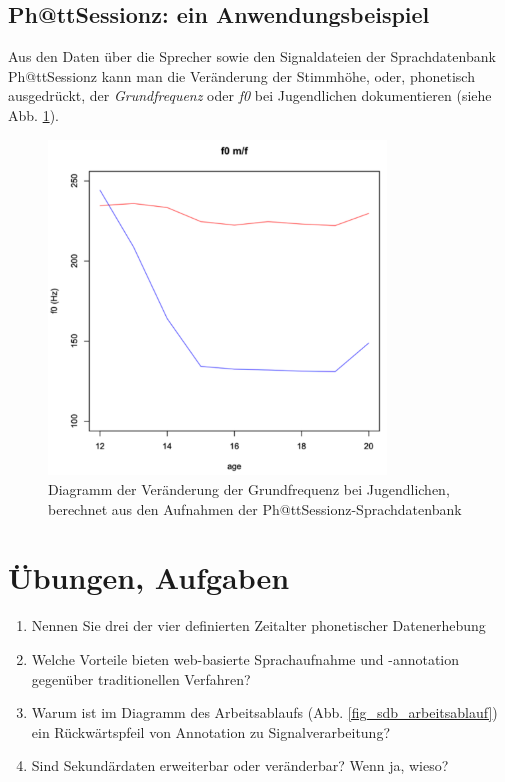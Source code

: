 \documentclass[11pt]{book}
\begin{document}
\subsection*{Ph@ttSessionz: ein Anwendungsbeispiel}
Aus den Daten über die Sprecher sowie den Signaldateien der Sprachdatenbank Ph@ttSessionz kann man die Veränderung der Stimmhöhe, oder, phonetisch ausgedrückt, der {\em Grundfrequenz} oder {\em f0} bei Jugendlichen dokumentieren (siehe Abb. \ref{fig_sdb_grundfrequenz}). 
\begin{figure}[htbp]
\begin{center}
\includegraphics[width=0.8\textwidth]{grafiken/sprachdatenbanken/f0-entwicklung-phatt}
\caption{Diagramm der Veränderung der Grundfrequenz bei Jugendlichen, berechnet aus den Aufnahmen der Ph@ttSessionz-Sprachdatenbank}
\label{fig_sdb_grundfrequenz}
\end{center}
\end{figure}

\section{Übungen, Aufgaben}

\begin{enumerate}
\item{Nennen Sie drei der vier definierten Zeitalter phonetischer Datenerhebung}
\vspace{2cm}
\item{Welche Vorteile bieten web-basierte Sprachaufnahme und -annotation gegenüber traditionellen Verfahren?}
\vspace{2cm}
\item{Warum ist im Diagramm des Arbeitsablaufs (Abb. \ref{fig_sdb_arbeitsablauf}) ein Rückwärtspfeil von Annotation zu Signalverarbeitung?}
\vspace{2cm}
\item{Sind Sekundärdaten erweiterbar oder veränderbar? Wenn ja, wieso?}
\vspace{2cm}
\end{enumerate}
\end{document}
